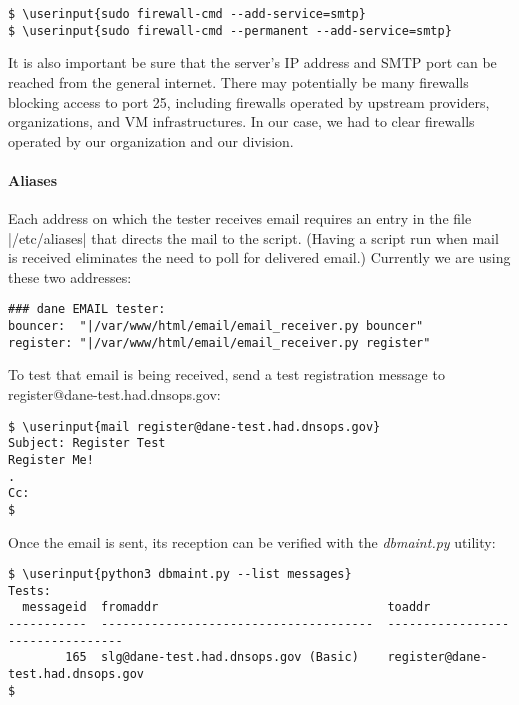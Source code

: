 \documentclass[preprint,3p,11pt]{elsarticle}
\newcommand\userinput[1]{\textbf{#1}}
\begin{document}
\begin{Verbatim}[commandchars=\\\{\},fontsize=\small]
$ \userinput{sudo firewall-cmd --add-service=smtp}
$ \userinput{sudo firewall-cmd --permanent --add-service=smtp}
\end{Verbatim}

It is also important be sure that the server's IP address and SMTP
port can be reached from the general internet. There may potentially
be many firewalls blocking access to port 25, including firewalls
operated by upstream providers, organizations, and VM
infrastructures. In our case, we had to clear firewalls operated by
our organization and our division.

\paragraph{Aliases}

Each address on which the tester receives email requires an entry in
the file |/etc/aliases| that directs the mail to the script. (Having a
script run when mail is received eliminates the need to poll for
delivered email.)  Currently we are using these two addresses:

\begin{Verbatim}[commandchars=\\\{\},fontsize=\small]
### dane EMAIL tester:
bouncer:  "|/var/www/html/email/email_receiver.py bouncer"
register: "|/var/www/html/email/email_receiver.py register"
\end{Verbatim}

To test that email is being received, send a test registration message
to register@dane-test.had.dnsops.gov:

\begin{Verbatim}[commandchars=\\\{\},fontsize=\small]
$ \userinput{mail register@dane-test.had.dnsops.gov}
Subject: Register Test
Register Me!
.
Cc:
$
\end{Verbatim}

Once the email is sent, its reception can be verified with the
\emph{dbmaint.py} utility:

\begin{Verbatim}[commandchars=\\\{\},fontsize=\tiny]
$ \userinput{python3 dbmaint.py --list messages}
Tests:
  messageid  fromaddr                                toaddr                                    
-----------  --------------------------------------  ---------------------------------
        165  slg@dane-test.had.dnsops.gov (Basic)    register@dane-test.had.dnsops.gov         
$
\end{Verbatim}
\end{document}
